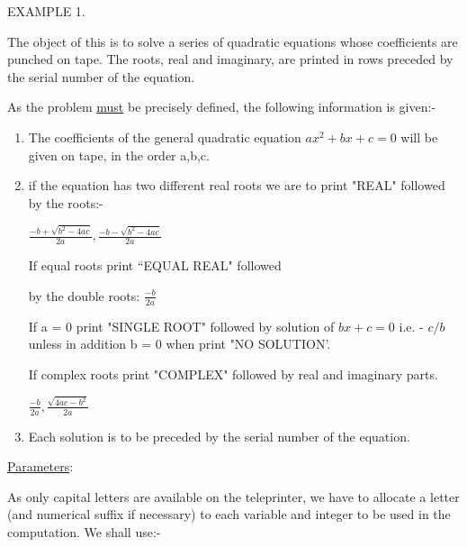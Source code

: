 \documentclass[10pt, a4paper, oneside]{article}
\newcommand{\myuline}[1]{\uline{#1}}
\begin{document}
\begin{multicols}{2}

\begin{flushleft}
EXAMPLE 1.
\end{flushleft}

The object of this is to solve a series of
quadratic equations whose coefficients are punched on
tape.  The roots, real and imaginary, are printed in
rows preceded by the serial number of the equation.

As the problem \myuline{must} be precisely defined, the
following information is given:-

\renewcommand{\labelenumi}{(\alph{enumi}).}
\begin{enumerate}

\item The coefficients of the general quadratic
equation $ax^{2} + bx + c = 0$ will be given on tape, in
the order a,b,c.

\item if the equation has two different real roots
we are to print "REAL" followed by the roots:-

\begin{math}
\frac{-b+\sqrt{b^{2}-4ac}}{2a}, \frac{-b-\sqrt{b^{2}-4ac}}{2a}
\end{math}

If equal roots print “EQUAL REAL" followed

by the double roots:
\begin{math}
\frac{-b}{2a}
\end{math}

If a = 0 print "SINGLE ROOT" followed by
solution of $bx + c = 0$ i.e. - $c/b$ unless in addition
b = 0 when print "NO SOLUTION'.

If complex roots print "COMPLEX" followed
by real and imaginary parts.

\begin{math}
\frac{-b}{2a}, \frac{\sqrt{4ac-b^{2}}}{2a}
\end{math}

\item Each solution is to be preceded by the serial
number of the equation.

\end{enumerate}

\begin{flushleft}
\myuline{Parameters}:
\end{flushleft}

As only capital letters are available on the
teleprinter, we have to allocate a letter (and
numerical suffix if necessary) to each variable and
integer to be used in the computation.  We shall use:-


\end{multicols}
\end{document}
